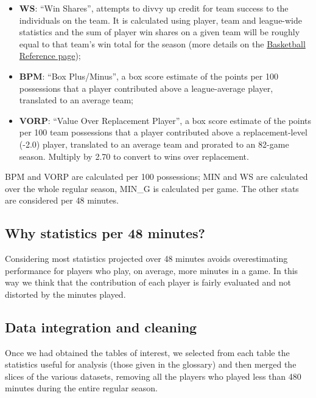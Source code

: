\documentclass[
]{article}
\providecommand{\tightlist}{%
  \setlength{\itemsep}{0pt}\setlength{\parskip}{0pt}}
\begin{document}
\begin{itemize}
\tightlist
\item
  \textbf{WS}: ``Win Shares'', attempts to divvy up credit for team
  success to the individuals on the team. It is calculated using player,
  team and league-wide statistics and the sum of player win shares on a
  given team will be roughly equal to that team's win total for the
  season (more details on the
  \href{https://www.basketball-reference.com/about/ws.html}{Basketball
  Reference page});
\item
  \textbf{BPM}: ``Box Plus/Minus'', a box score estimate of the points
  per 100 possessions that a player contributed above a league-average
  player, translated to an average team;
\item
  \textbf{VORP}: ``Value Over Replacement Player'', a box score estimate
  of the points per 100 team possessions that a player contributed above
  a replacement-level (-2.0) player, translated to an average team and
  prorated to an 82-game season. Multiply by 2.70 to convert to wins
  over replacement.
\end{itemize}

BPM and VORP are calculated per 100 possessions; MIN and WS are
calculated over the whole regular season, MIN\_G is calculated per game.
The other stats are considered per 48 minutes.

\hypertarget{why-statistics-per-48-minutes}{%
\subsection{Why statistics per 48
minutes?}\label{why-statistics-per-48-minutes}}

Considering most statistics projected over 48 minutes avoids
overestimating performance for players who play, on average, more
minutes in a game. In this way we think that the contribution of each
player is fairly evaluated and not distorted by the minutes played.

\hypertarget{data-integration-and-cleaning}{%
\subsection{Data integration and
cleaning}\label{data-integration-and-cleaning}}

Once we had obtained the tables of interest, we selected from each table
the statistics useful for analysis (those given in the glossary) and
then merged the slices of the various datasets, removing all the players
who played less than 480 minutes during the entire regular season.
\end{document}
